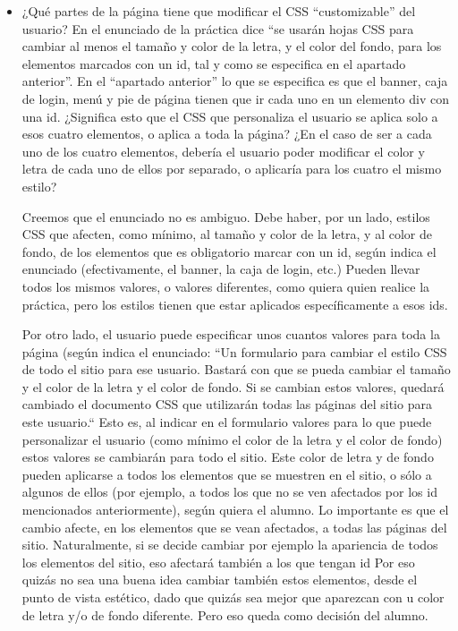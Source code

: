 \begin{itemize}
\item ¿Qué partes de la página tiene que modificar el CSS ``customizable'' del usuario? En el enunciado de la práctica dice ``se usarán hojas CSS para cambiar al menos el tamaño y color de la letra, y el color del fondo, para los elementos marcados con un id, tal y como se especifica en el apartado anterior''. En el ``apartado anterior'' lo que se especifica es que el banner, caja de login, menú y pie de página tienen que ir cada uno en un elemento div con una id. ¿Significa esto que el CSS que personaliza el usuario se aplica solo a esos cuatro elementos, o aplica a toda la página? ¿En el caso de ser a cada uno de los cuatro elementos, debería el usuario poder modificar el color y letra de cada uno de ellos por separado, o aplicaría para los cuatro el mismo estilo?

  Creemos que el enunciado no es ambiguo. Debe haber, por un lado, estilos CSS que afecten, como mínimo, al tamaño y color de la letra, y al color de fondo, de los elementos que es obligatorio marcar con un id, según indica el enunciado (efectivamente, el banner, la caja de login, etc.) Pueden llevar todos los mismos valores, o valores diferentes, como quiera quien realice la práctica, pero los estilos tienen que estar aplicados específicamente a esos ids.

  Por otro lado, el usuario puede especificar unos cuantos valores para toda la página (según indica el enunciado: ``Un formulario para cambiar el estilo CSS de todo el sitio para ese usuario. Bastará con que se pueda cambiar el tamaño y el color de la letra y el color de fondo. Si se cambian estos valores, quedará cambiado el documento CSS que utilizarán todas las páginas del sitio para este usuario.`` Esto es, al indicar en el formulario valores para lo que puede personalizar el usuario (como mínimo el color de la letra y el color de fondo) estos valores se cambiarán para todo el sitio. Este color de letra y de fondo pueden aplicarse a todos los elementos que se muestren en el sitio, o sólo a algunos de ellos (por ejemplo, a todos los que no se ven afectados por los id mencionados anteriormente), según quiera el alumno. Lo importante es que el cambio afecte, en los elementos que se vean afectados, a todas las páginas del sitio. Naturalmente, si se decide cambiar por ejemplo la apariencia de todos los elementos del sitio, eso afectará también a los que tengan id Por eso quizás no sea una buena idea cambiar también estos elementos, desde el punto de vista estético, dado que quizás sea mejor que aparezcan con u  color de letra y/o de fondo diferente. Pero eso queda como decisión del alumno.
  

\end{itemize}
